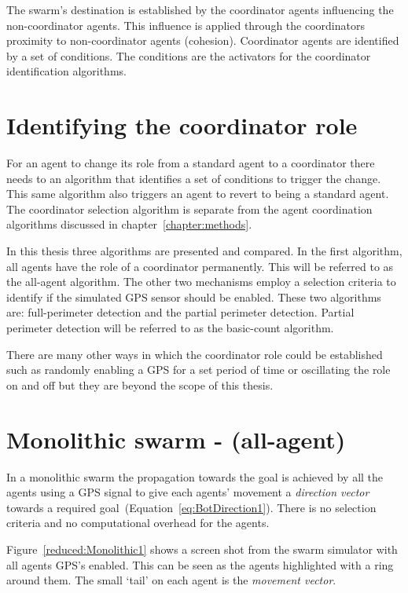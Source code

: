 The swarm's destination is established by the coordinator agents influencing the non-coordinator agents. This influence is applied through the coordinators proximity to non-coordinator agents (cohesion). Coordinator agents are identified by a set of conditions. The conditions are the activators for the coordinator identification algorithms.

\section{Identifying the coordinator role}
For an agent to change its role from a standard agent to a coordinator there needs to an algorithm that identifies a set of conditions to trigger the change. This same algorithm also triggers an agent to revert to being a standard agent. The coordinator selection algorithm is separate from the agent coordination algorithms discussed in chapter~\ref{chapter:methods}.

In this thesis three algorithms are presented and compared. In the first algorithm, all agents have the role of a coordinator permanently. This will be referred to as the all-agent algorithm. The other two mechanisms employ a selection criteria to identify if the simulated GPS sensor should be enabled. These two algorithms are: full-perimeter detection and the partial perimeter detection. Partial perimeter detection will be referred to as the basic-count algorithm.

There are many other ways in which the coordinator role could be established such as randomly enabling a GPS for a set period of time or oscillating the role on and off but they are beyond the scope of this thesis.

\section{Monolithic swarm - (all-agent)} 
In a monolithic swarm \cite{BS:13} the propagation towards the goal is achieved by all the agents using a GPS signal to give each agents' movement a \textit{direction vector} towards a required goal~(Equation~\ref{eq:BotDirection1}). There is no selection criteria and no computational overhead for the agents.

Figure~\ref{reduced:Monolithic1} shows a screen shot from the swarm simulator with all agents GPS's enabled. This can be seen as the agents highlighted with a ring around them. The small `tail' on each agent is the \textit{movement vector}.

